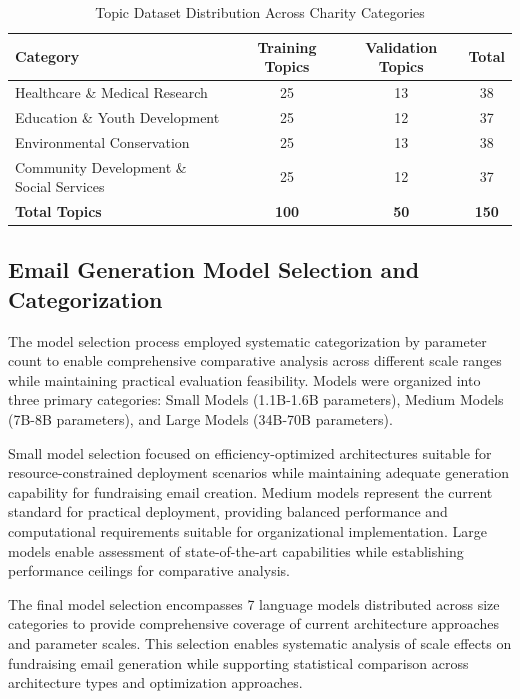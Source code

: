 \begin{table}[H]
    \centering
    \caption[Topic Dataset Distribution]{Topic Dataset Distribution Across Charity Categories}
    \label{tab:topic-distribution}
    \begin{tabular}{|l|c|c|c|}
    \hline
    \textbf{Category} & \textbf{Training Topics} & \textbf{Validation Topics} & \textbf{Total} \\
    \hline
    Healthcare \& Medical Research & 25 & 13 & 38 \\
    Education \& Youth Development & 25 & 12 & 37 \\
    Environmental Conservation & 25 & 13 & 38 \\
    Community Development \& Social Services & 25 & 12 & 37 \\
    \hline
    \textbf{Total Topics} & \textbf{100} & \textbf{50} & \textbf{150} \\
    \hline
    \end{tabular}
\end{table}

\subsection{Email Generation Model Selection and Categorization}

The model selection process employed systematic categorization by parameter count to enable comprehensive comparative analysis across different scale ranges while maintaining practical evaluation feasibility. Models were organized into three primary categories: Small Models (1.1B-1.6B parameters), Medium Models (7B-8B parameters), and Large Models (34B-70B parameters).

Small model selection focused on efficiency-optimized architectures suitable for resource-constrained deployment scenarios while maintaining adequate generation capability for fundraising email creation. Medium models represent the current standard for practical deployment, providing balanced performance and computational requirements suitable for organizational implementation. Large models enable assessment of state-of-the-art capabilities while establishing performance ceilings for comparative analysis.

The final model selection encompasses 7 language models distributed across size categories to provide comprehensive coverage of current architecture approaches and parameter scales. This selection enables systematic analysis of scale effects on fundraising email generation while supporting statistical comparison across architecture types and optimization approaches.

